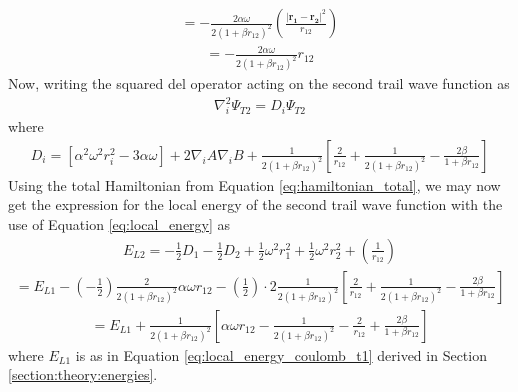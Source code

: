 \documentclass[12pt,english,a4paper]{article}
\begin{document}
\begin{align*}
    = -\frac{2\alpha\omega}{2\left(1+\beta r_{12}\right)^2}\left(\frac{|\boldsymbol{r_1}-\boldsymbol{r_2}|^2}{r_{12}}\right)
\end{align*}
\begin{align*}
    = -\frac{2\alpha\omega}{2\left(1+\beta r_{12}\right)^2}r_{12}
\end{align*}
Now, writing the squared del operator acting on the second trail wave function as
\begin{align*}
    \nabla_i^2 \Psi_{T2}=D_i\Psi_{T2}
\end{align*}
where
\begin{align*}
    D_i=\left[\alpha^2\omega^2 r_i^2-3\alpha\omega\right]+2\nabla_i A\nabla_i B+\frac{1}{2\left(1+\beta r_{12}\right)^2}\left[\frac{2}{r_{12}}+\frac{1}{2\left(1+\beta r_{12}\right)^2}-\frac{2\beta}{1+\beta r_{12}}\right]
\end{align*}
Using the total Hamiltonian from Equation \eqref{eq:hamiltonian_total}, we may now get the expression for the local energy of the second trail wave function with the use of Equation \eqref{eq:local_energy} as
\begin{align*}
    E_{L2}=-\frac{1}{2}D_1-\frac{1}{2}D_2+\frac{1}{2}\omega^2r_1^2+\frac{1}{2}\omega^2r_2^2+\left(\frac{1}{r_{12}}\right)
\end{align*} 
\begin{align*}
    =E_{L1}-\left(-\frac{1}{2}\right)\frac{2}{2\left(1+\beta r_{12}\right)^2}\alpha\omega r_{12}-\left(\frac{1}{2}\right)\cdot 2\frac{1}{2\left(1+\beta r_{12}\right)^2}\left[\frac{2}{r_{12}}+\frac{1}{2\left(1+\beta r_{12}\right)^2}-\frac{2\beta}{1+\beta r_{12}}\right]
\end{align*}
\begin{align*}
    =E_{L1}+\frac{1}{2\left(1+\beta r_{12}\right)^2}\left[\alpha\omega r_{12}-\frac{1}{2\left(1+\beta r_{12}\right)^2}-\frac{2}{r_{12}}+\frac{2\beta}{1+\beta r_{12}}\right]
\end{align*}
where $E_{L1}$ is as in Equation \eqref{eq:local_energy_coulomb_t1} derived in Section \ref{section:theory:energies}.

\newpage

\printbibliography
\end{document}

